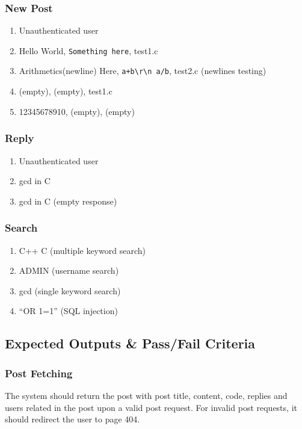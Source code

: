\subsubsection{New Post}
\begin{enumerate}
  \item Unauthenticated user
  \item Hello World, \verb|Something here|, test1.c
  \item Arithmetics(newline) Here, \verb|a+b\r\n a/b|, test2.c (newlines testing)
  \item (empty), (empty), test1.c
  \item 12345678910, (empty), (empty)
\end{enumerate}

\subsubsection{Reply}
\begin{enumerate}
  \item Unauthenticated user
  \item gcd in C
  \item gcd in C (empty response)
\end{enumerate}

\subsubsection{Search}
\begin{enumerate}
  \item C++ C (multiple keyword search)
  \item ADMIN (username search)
  \item gcd (single keyword search)
  \item ``OR 1=1'' (SQL injection)
\end{enumerate}

\subsection{Expected Outputs \& Pass/Fail Criteria}
\subsubsection{Post Fetching}
The system should return the post with post title, content, code, replies and users related in the post upon a valid post request. For invalid post requests, it should redirect the user to page 404.

~

